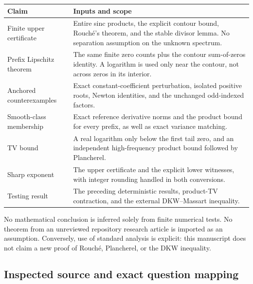 \documentclass[11pt,a4paper]{article}
\numberwithin{equation}{section}
\theoremstyle{definition}
\theoremstyle{remark}
\begin{document}
\begin{center}
\small
\begin{tabular}{@{}p{}p{}@{}}
\toprule
Claim & Inputs and scope\\
\midrule
Finite upper certificate & Entire sinc products, the explicit contour bound,
Rouch\'e's theorem, and the stable divisor lemma. No separation assumption on
the unknown spectrum.\\[4pt]
Prefix Lipschitz theorem & The same finite zero counts plus the contour
sum-of-zeros identity. A logarithm is used only near the contour, not across
zeros in its interior.\\[4pt]
Anchored counterexamples & Exact constant-coefficient perturbation, isolated
positive roots, Newton identities, and the unchanged odd-indexed factors.\\[4pt]
Smooth-class membership & Exact reference derivative norms and the product
bound for every prefix, as well as exact variance matching.\\[4pt]
TV bound & A real logarithm only below the first tail zero, and an independent
high-frequency product bound followed by Plancherel.\\[4pt]
Sharp exponent & The upper certificate and the explicit lower witnesses,
with integer rounding handled in both conversions.\\[4pt]
Testing result & The preceding deterministic results, product-TV contraction,
and the external DKW--Massart inequality.\\
\bottomrule
\end{tabular}
\end{center}

No mathematical conclusion is inferred solely from finite numerical tests.
No theorem from an unreviewed repository research article is imported as an
assumption. Conversely, use of standard analysis is explicit: this manuscript
does not claim a new proof of Rouch\'e, Plancherel, or the DKW inequality.

\subsection{Inspected source and exact question mapping}
\end{document}
